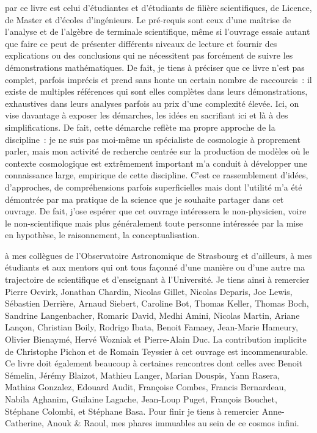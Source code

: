  par ce livre est celui d'étudiantes et d'étudiants de filière scientifiques, de Licence, de Master et d'écoles d'ingénieurs. Le pré-requis sont ceux d'une maîtrise de l'analyse et de l'algèbre de terminale scientifique, même si l'ouvrage essaie autant que faire ce peut de présenter différents niveaux de lecture et fournir des explications ou des conclusions qui ne nécessitent pas forcément de suivre les démonstrations mathématiques. De fait, je tiens à préciser que ce livre n'est pas complet, parfois imprécis et prend sans honte un certain nombre de raccourcis~: il existe de multiples références qui sont elles complètes dans leurs démonstrations, exhaustives dans leurs analyses parfois au prix d'une complexité élevée. Ici, on vise davantage à exposer les démarches, les idées en sacrifiant ici et là à des simplifications. De fait, cette démarche reflète ma propre approche de la discipline~: je ne suis pas moi-même un spécialiste de cosmologie à proprement parler, mais mon activité de recherche centrée sur la production de modèles où le contexte cosmologique est extrêmement important m'a conduit à développer une connaissance large, empirique de cette discipline. C'est ce rassemblement d'idées, d'approches, de compréhensions parfois superficielles mais dont l'utilité m'a été démontrée par ma pratique de la science que je souhaite partager dans cet ouvrage. De fait, j'ose espérer que cet ouvrage intéressera le non-physicien, voire le non-scientifique mais plus généralement toute personne intéressée par la mise en hypothèse, le raisonnement, la conceptualisation.

 à mes collègues de l'Observatoire Astronomique de Strasbourg et d'ailleurs, à mes étudiants et aux mentors qui ont tous façonné d'une manière ou d'une autre ma trajectoire de scientifique et d'enseignant à l'Université. Je tiens ainsi à remercier Pierre Ocvirk, Jonathan Chardin, Nicolas Gillet, Nicolas Deparis, Joe Lewis, Sébastien Derrière, Arnaud Siebert, Caroline Bot, Thomas Keller, Thomas Boch, Sandrine Langenbacher, Romaric David, Medhi Amini, Nicolas Martin, Ariane Lançon, Christian Boily, Rodrigo Ibata, Benoit Famaey, Jean-Marie Hameury, Olivier Bienaymé, Hervé Wozniak et Pierre-Alain Duc. La contribution implicite de Christophe Pichon et de Romain Teyssier à cet ouvrage est incommensurable. Ce livre doit également beaucoup à certaines rencontres dont celles avec Benoit Sémelin, Jérémy Blaizot, Mathieu Langer, Marian Douspis, Yann Rasera, Mathias Gonzalez, Edouard Audit, Françoise Combes, Francis Bernardeau, Nabila Aghanim, Guilaine Lagache, Jean-Loup Puget, François Bouchet, Stéphane Colombi, et Stéphane Basa. Pour finir je tiens à remercier Anne-Catherine, Anouk \& Raoul, mes phares immuables au sein de ce cosmos infini.